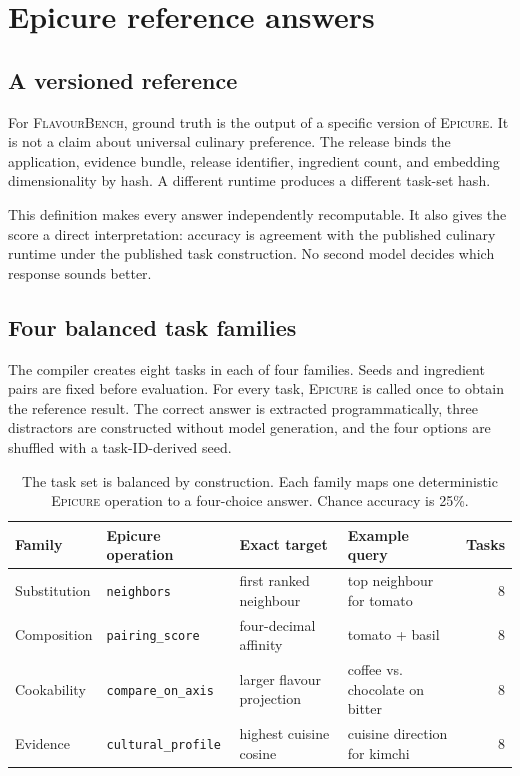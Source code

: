 \documentclass{article}
\newcommand{\system}{\textsc{FlavourBench}}
\newcommand{\epicure}{\textsc{Epicure}}
\begin{document}
\section{Epicure reference answers}
\label{sec:oracle}

\subsection{A versioned reference}

For \system{}, ground truth is the output of a specific version of \epicure{}. It is not a claim
about universal culinary preference. The release binds the application, evidence bundle, release
identifier, ingredient count, and embedding dimensionality by hash. A different runtime produces a
different task-set hash.

This definition makes every answer independently recomputable. It also gives the score a direct
interpretation: accuracy is agreement with the published culinary runtime under the published task
construction. No second model decides which response sounds better.

\subsection{Four balanced task families}

The compiler creates eight tasks in each of four families. Seeds and ingredient pairs are fixed
before evaluation. For every task, \epicure{} is called once to obtain the reference result. The
correct answer is extracted programmatically, three distractors are constructed without model
generation, and the four options are shuffled with a task-ID-derived seed.

\begin{table}[t]
  \centering
  \footnotesize
  \setlength{\tabcolsep}{3pt}
  \begin{tabularx}{\linewidth}{@{}l l X X r@{}}
    \toprule
    Family & Epicure operation & Exact target & Example query & Tasks \\
    \midrule
    Substitution & \texttt{neighbors} & first ranked neighbour & top neighbour for tomato & 8 \\
    Composition & \texttt{pairing\_score} & four-decimal affinity & tomato + basil & 8 \\
    Cookability & \texttt{compare\_on\_axis} & larger flavour projection & coffee vs. chocolate on bitter & 8 \\
    Evidence & \texttt{cultural\_profile} & highest cuisine cosine & cuisine direction for kimchi & 8 \\
    \bottomrule
  \end{tabularx}
  \caption{The task set is balanced by construction. Each family maps one deterministic \epicure{}
  operation to a four-choice answer. Chance accuracy is 25\%.}
  \label{tab:tasks}
\end{table}
\end{document}

